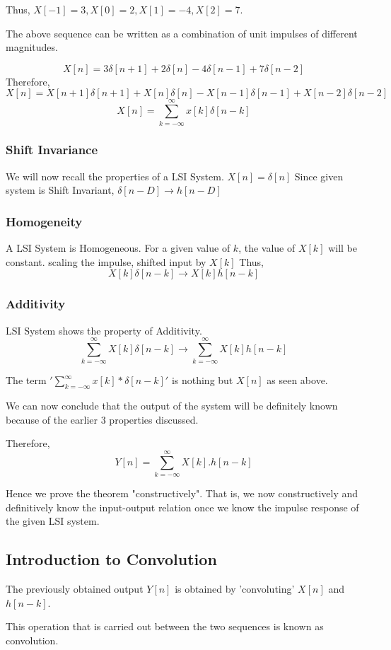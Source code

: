 Thus, $X[-1]=3, X[0]=2, X[1]=-4, X[2]=7$.

The above sequence can be written as a combination of unit impulses of different magnitudes.

$$ X[n]= 3\delta[n+1] + 2\delta[n] - 4\delta[n-1] + 7\delta[n-2]$$
Therefore, 
$$ X[n]= X[n+1]\delta[n+1] + X[n]\delta[n] - X[n-1]\delta[n-1] + X[n-2]\delta[n-2]$$
$$X[n]=\sum_{k=-\infty}^{\infty} x[k]\delta[n-k]$$

\subsubsection{Shift Invariance}
We will now recall the properties of a LSI System. 
$X[n]=\delta[n]$
Since given system is Shift Invariant,
$\delta[n-D]\rightarrow h[n-D]$

\subsubsection{Homogeneity}
A LSI System is Homogeneous.
For a given value of $k$, the value of $X[k]$ will be constant.
scaling the impulse, shifted input by $X[k]$
Thus, $$X[k]\delta[n-k]\rightarrow X[k]h[n-k]$$

\subsubsection{Additivity}
LSI System shows the property of Additivity. 
$$\sum_{k=-\infty}^{\infty} X[k]\delta[n-k]\rightarrow \sum_{k=-\infty}^{\infty} X[k]h[n-k]$$


The term $'\sum_{k=-\infty}^{\infty} x[k]*\delta[n-k]'$ is nothing but $X[n]$ as seen above.

We can now conclude that the output of the system will be definitely known because of the earlier 3 properties discussed.

Therefore,$$Y[n]=\sum_{k=-\infty}^{\infty} X[k].h[n-k]$$

Hence we prove the theorem "constructively". That is, we now constructively and definitively know the input-output relation once we know the impulse response of the given LSI system.

\subsection{Introduction to Convolution}
The previously obtained output $Y[n]$ is obtained by 'convoluting' $X[n]$ and $h[n-k]$. 

This operation that is carried out between the two sequences is known as convolution. 

